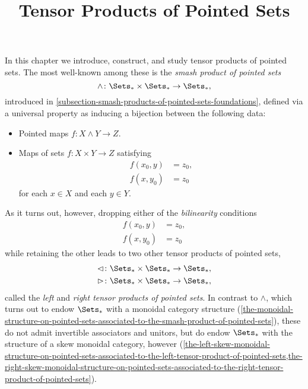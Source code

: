 

%



\title{Tensor Products of Pointed Sets}

\maketitle

\label{section-phantom}

In this chapter we introduce, construct, and study tensor products of pointed sets. The most well-known among these is the \emph{smash product of pointed sets}
\[
    \wedge%
    \colon%
    \Sets_{*}\times\Sets_{*}%
    \to%
    \Sets_{*},
\]%
introduced in \cref{subsection-smash-products-of-pointed-sets-foundations}, defined via a universal property as inducing a bijection between the following data:
\begin{itemize}
    \item Pointed maps $f\colon X\wedge Y\to Z$.
    \item Maps of sets $f\colon X\times Y\to Z$ satisfying
        \begin{align*}
            f(x_{0},y) &= z_{0},\\
            f(x,y_{0}) &= z_{0}
        \end{align*}
        for each $x\in X$ and each $y\in Y$.
\end{itemize}
As it turns out, however, dropping either of the \emph{bilinearity} conditions
\begin{align*}
    f(x_{0},y) &= z_{0},\\
    f(x,y_{0}) &= z_{0}
\end{align*}
while retaining the other leads to two other tensor products of pointed sets,
\begin{align*}
    \lhd &\colon \Sets_{*}\times\Sets_{*} \to \Sets_{*},\\
    \rhd &\colon \Sets_{*}\times\Sets_{*} \to \Sets_{*},
\end{align*}
called the \emph{left} and \emph{right tensor products of pointed sets}. In contrast to $\wedge$, which turns out to endow $\Sets_{*}$ with a monoidal category structure (\cref{the-monoidal-structure-on-pointed-sets-associated-to-the-smash-product-of-pointed-sets}), these do not admit invertible associators and unitors, but do endow $\Sets_{*}$ with the structure of a skew monoidal category, however (\cref{the-left-skew-monoidal-structure-on-pointed-sets-associated-to-the-left-tensor-product-of-pointed-sets,the-right-skew-monoidal-structure-on-pointed-sets-associated-to-the-right-tensor-product-of-pointed-sets}).

